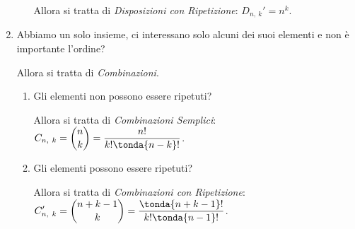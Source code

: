 \begin{procedura}
\begin{enumerate}
\begin{enumerate}[nosep]
Allora si tratta di \emph{Disposizioni con Ripetizione}: \hfill 
\(D_{n,~k}' = n^k\).
\end{enumerate}

\item 
Abbiamo un solo insieme, ci interessano solo alcuni dei suoi elementi 
e non è importante l'ordine?

Allora si tratta di \emph{Combinazioni}.
\begin{enumerate}[nosep]
\item Gli elementi non possono essere ripetuti?

Allora si tratta di \emph{Combinazioni Semplici}: \hfill 
\(\displaystyle C_{n,~k} = \binom{n}{k} = \dfrac{n!}{k! \tonda{n-k}!}\).
\item Gli elementi possono essere ripetuti?

Allora si tratta di \emph{Combinazioni con Ripetizione}: \\ 
\phantom{0}\hfill
\(\displaystyle C_{n,~k}' = \binom{n+k-1}{k} = 
                \dfrac{\tonda{n+k-1}!}{k! \tonda{n-1}!}\).
\end{enumerate}
\end{enumerate}
\end{procedura}

